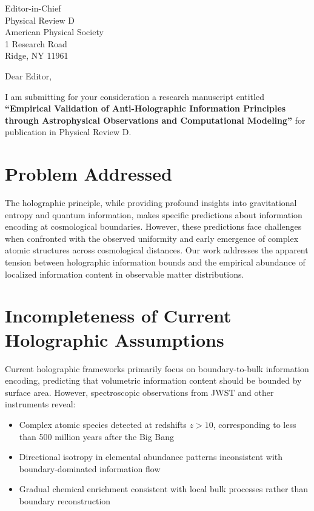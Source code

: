 \documentclass[11pt]{letter}
\begin{document}
\begin{letter}{Editor-in-Chief\\Physical Review D\\American Physical Society\\1 Research Road\\Ridge, NY 11961}

\opening{Dear Editor,}

I am submitting for your consideration a research manuscript entitled \textbf{``Empirical Validation of Anti-Holographic Information Principles through Astrophysical Observations and Computational Modeling''} for publication in Physical Review D.

\section*{Problem Addressed}

The holographic principle, while providing profound insights into gravitational entropy and quantum information, makes specific predictions about information encoding at cosmological boundaries. However, these predictions face challenges when confronted with the observed uniformity and early emergence of complex atomic structures across cosmological distances. Our work addresses the apparent tension between holographic information bounds and the empirical abundance of localized information content in observable matter distributions.

\section*{Incompleteness of Current Holographic Assumptions}

Current holographic frameworks primarily focus on boundary-to-bulk information encoding, predicting that volumetric information content should be bounded by surface area. However, spectroscopic observations from JWST and other instruments reveal:

\begin{itemize}
    \item Complex atomic species detected at redshifts $z > 10$, corresponding to less than 500 million years after the Big Bang
    \item Directional isotropy in elemental abundance patterns inconsistent with boundary-dominated information flow
    \item Gradual chemical enrichment consistent with local bulk processes rather than boundary reconstruction
\end{itemize}


\end{letter}
\end{document}
